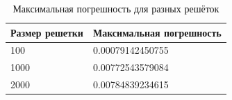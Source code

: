 \documentclass[12pt,notitlepage,oneside]{extarticle}
\begin{document}
\begin{table}[h]
  \centering
  \caption{Максимальная погрешность для разных решёток}
  \label{err:table}
  \begin{tabular}{|l|l|}
    \hline
    \textbf{Размер решетки}    & \textbf{Максимальная погрешность} \\ \hline
    100  & 0.00079142450755                  \\ \hline
    1000                       & 0.00772543579084                  \\ \hline
    2000 & 0.00784839234615                  \\ \hline
  \end{tabular}
\end{table}
\end{document}
